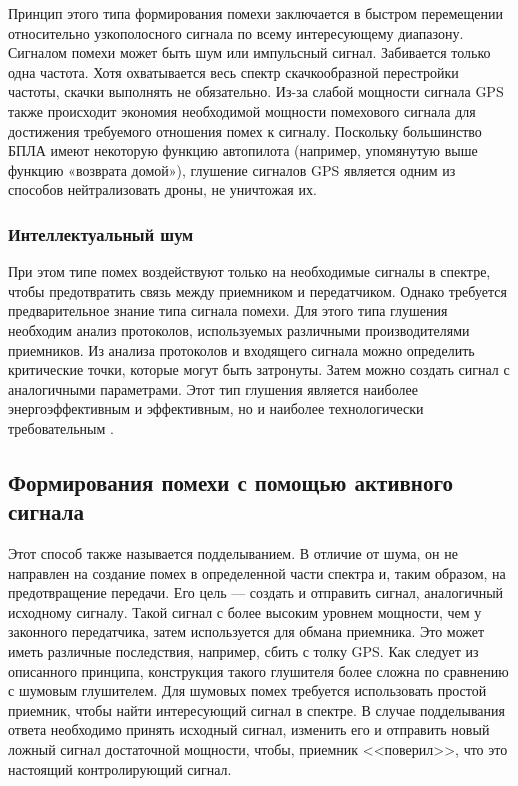 Принцип этого типа формирования помехи заключается в быстром перемещении относительно узкополосного сигнала по всему интересующему диапазону. Сигналом помехи может быть шум или импульсный сигнал. Забивается только одна частота. Хотя охватывается весь спектр скачкообразной перестройки частоты, скачки выполнять не обязательно. Из-за слабой мощности сигнала GPS также происходит экономия необходимой мощности помехового сигнала для достижения требуемого отношения помех к сигналу. Поскольку большинство БПЛА имеют некоторую функцию автопилота (например, упомянутую выше функцию «возврата домой»), глушение сигналов GPS является одним из способов нейтрализовать дроны, не уничтожая их.

\subsubsection*{Интеллектуальный шум}

При этом типе помех воздействуют только на необходимые сигналы в спектре, чтобы предотвратить связь между приемником и передатчиком. Однако требуется предварительное знание типа сигнала помехи. Для этого типа глушения необходим анализ протоколов, используемых различными производителями приемников. Из анализа протоколов и входящего сигнала можно определить критические точки, которые могут быть затронуты. Затем можно создать сигнал с аналогичными параметрами. Этот тип глушения является наиболее энергоэффективным и эффективным, но и наиболее технологически требовательным \cite{intellectnoise}.

\subsection*{Формирования помехи с помощью активного сигнала}

Этот способ также называется подделыванием. В отличие от шума, он не направлен на создание помех в определенной части спектра и, таким образом, на предотвращение передачи. Его цель --- создать и отправить сигнал, аналогичный исходному сигналу. Такой сигнал с более высоким уровнем мощности, чем у законного передатчика, затем используется для обмана приемника. Это может иметь различные последствия, например, сбить с толку GPS. Как следует из описанного принципа, конструкция такого глушителя более сложна по сравнению с шумовым глушителем. Для шумовых помех требуется использовать простой приемник, чтобы найти интересующий сигнал в спектре. В случае подделывания ответа необходимо принять исходный сигнал, изменить его и отправить новый ложный сигнал достаточной мощности, чтобы, приемник <<поверил>>, что это настоящий контролирующий сигнал.

